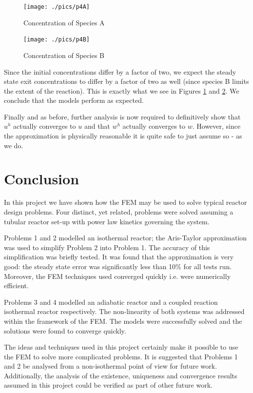 \documentclass[11pt,fleqn]{article}
\theoremstyle{defstyle}
\begin{document}
\begin{figure}[H] 
\centering
\texttt{[image: ./pics/p4A]}
\caption{Concentration of Species A} 
\label{fig_p4A}
\end{figure}
\begin{figure}[H] 
\centering
\texttt{[image: ./pics/p4B]}
\caption{Concentration of Species B} 
\label{fig_p4B}
\end{figure}
Since the initial concentrations differ by a factor of two, we expect the steady state exit concentrations to differ by a factor of two as well (since species B limits the extent of the reaction). This is exactly what we see in Figures \ref{fig_p4A} and \ref{fig_p4B}. We conclude that the models perform as expected.

Finally and as before, further analysis is now required to definitively show that $u^h$ actually converges to $u$ and that $w^h$ actually converges to $w$. However, since the approximation is physically reasonable it is quite safe to just assume so - as we do.

\section{Conclusion}
In this project we have shown how the FEM may be used to solve typical reactor design problems. Four distinct, yet related, problems were solved assuming a tubular reactor set-up with power law kinetics governing the system.

Problems 1 and 2 modelled an isothermal reactor; the Aris-Taylor approximation was used to simplify Problem 2 into Problem 1. The accuracy of this simplification was briefly tested. It was found that the approximation is very good: the steady state error was significantly less than 10\% for all tests run. Moreover, the FEM techniques used converged quickly i.e. were numerically efficient.

Problems 3 and 4 modelled an adiabatic reactor and a coupled reaction isothermal reactor respectively. The non-linearity of both systems was addressed within the framework of the FEM. The models were successfully solved and the solutions were found to converge quickly. 

The ideas and techniques used in this project certainly make it possible to use the FEM to solve more complicated problems. It is suggested that Problems 1 and 2 be analysed from a non-isothermal point of view for future work. Additionally, the analysis of the existence, uniqueness and convergence results assumed in this project could be verified as part of other future work. 

\newpage


\end{document}
